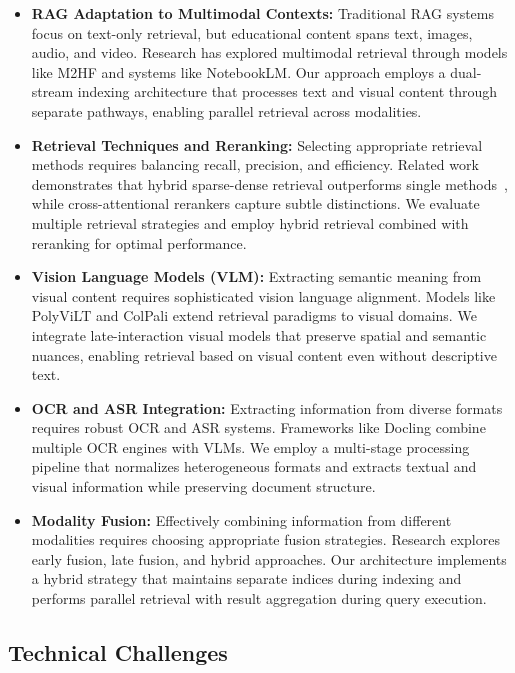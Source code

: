 \begin{itemize}
    \item \textbf{RAG Adaptation to Multimodal Contexts:} Traditional RAG systems focus on text-only retrieval, but educational content spans text, images, audio, and video. Research has explored multimodal retrieval through models like M2HF and systems like NotebookLM. Our approach employs a dual-stream indexing architecture that processes text and visual content through separate pathways, enabling parallel retrieval across modalities.
    
    \item \textbf{Retrieval Techniques and Reranking:} Selecting appropriate retrieval methods requires balancing recall, precision, and efficiency. Related work demonstrates that hybrid sparse-dense retrieval outperforms single methods~\cite{luan2021sparse_dense}, while cross-attentional rerankers capture subtle distinctions. We evaluate multiple retrieval strategies and employ hybrid retrieval combined with reranking for optimal performance.
    
    \item \textbf{Vision Language Models (VLM):} Extracting semantic meaning from visual content requires sophisticated vision language alignment. Models like PolyViLT and ColPali extend retrieval paradigms to visual domains. We integrate late-interaction visual models that preserve spatial and semantic nuances, enabling retrieval based on visual content even without descriptive text.
    
    \item \textbf{OCR and ASR Integration:} Extracting information from diverse formats requires robust OCR and ASR systems. Frameworks like Docling combine multiple OCR engines with VLMs. We employ a multi-stage processing pipeline that normalizes heterogeneous formats and extracts textual and visual information while preserving document structure.
    
    \item \textbf{Modality Fusion:} Effectively combining information from different modalities requires choosing appropriate fusion strategies. Research explores early fusion, late fusion, and hybrid approaches. Our architecture implements a hybrid strategy that maintains separate indices during indexing and performs parallel retrieval with result aggregation during query execution.
\end{itemize}

\subsection*{Technical Challenges}

